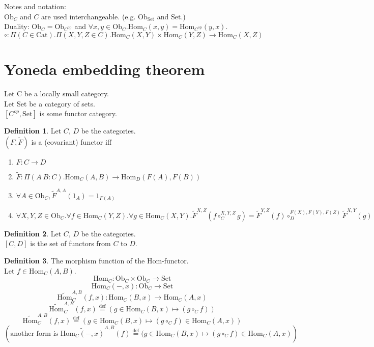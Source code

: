 \documentclass[10pt,a4paper]{article}
\theoremstyle{definition}
\newtheorem{definition}{Definition}[section]
\newcommand{\Ob}{{\mbox{Ob}}}
\newcommand{\Cat}{{\mbox{Cat}}}
\newcommand{\Hom}{{\mbox{Hom}}}
\newcommand{\HomMor}{{\widetilde{\Hom}\mbox{}}}
\newcommand{\FMor}{{\widetilde{F}\mbox{}}}
\newcommand{\op}{{\mbox{op}}}
\newcommand{\defi}{{\mbox{def}}}
\newcommand{\eqdef}{{\stackrel{\defi}{=}}}
\newcommand{\Set}{{\mbox{Set}}}
\begin{document}
Notes and notation:\\
$\Ob_C$ and $C$ are used interchangeable. (e.g. $\Ob_\Set$ and $\Set$.)\\
Duality: $\Ob_C = \Ob_{C^\op}$ and 
 $\forall x,y \in \Ob_C. \Hom_C(x,y) = \Hom_{C^\op}(y,x)$.\\
$\circ : \Pi(C\in \Cat).\Pi(X,Y,Z\in C).\Hom_C(X,Y)\times\Hom_C(Y,Z)\to\Hom_C(X,Z)$

\section{Yoneda embedding theorem}
Let C be a locally small category.\\
Let Set be a category of sets.\\
$[C^{op},\mbox{Set}]$ is some functor category.\\

\begin{definition}
Let $C$, $D$ be the categories.\\
 $(F, \FMor)$ is a (covariant) functor iff\\
\begin{enumerate}
\item $F:C \to D$
\item $\FMor:\Pi(A\ B:C).\Hom_C(A,B) \to \Hom_D(F(A), F(B))$
\item $\forall A\in \Ob_C, \FMor^{A,A}(1_A)=1_{F(A)}$
\item $\forall X,Y,Z \in \Ob_C.\forall f\in\Hom_C(Y,Z).\forall g\in\Hom_C(X,Y). \FMor^{X,Z}(f\circ_C^{X,Y,Z} g)=\FMor^{Y,Z}(f)\circ_D^{F(X),F(Y),F(Z)} \FMor^{X,Y}(g)$
\end{enumerate}

\end{definition}

\begin{definition}
Let $C$, $D$ be the categories.\\
$[C,D]$ is the set of functors from $C$ to $D$.\\
\end{definition}

\begin{definition} The morphism function of the Hom-functor.\\
Let $f\in\Hom_{C}(A,B)$.
$$\Hom_C: \Ob_C \times \Ob_C \to \Set$$
$$\Hom_C(-,x): \Ob_C \to \Set$$
$$\HomMor^{A,B}_C(f,x) : \Hom_C(B,x) \to \Hom_C(A,x)$$
$$\HomMor^{A,B}_C(f,x) \eqdef (g \in\Hom_C(B,x) \mapsto (g \circ_C f))$$
$$\HomMor^{A,B}_C(f,x) \eqdef (g \in\Hom_C(B,x) \mapsto (g \circ_C f) \in\Hom_C(A,x))$$
$$\left(\mbox{another form is }\widetilde{\Hom_C(-,x)}^{A,B}(f) \eqdef (g \in\Hom_C(B,x) \mapsto (g \circ_C f) \in\Hom_C(A,x)\right)$$
\end{definition}
\end{document}
